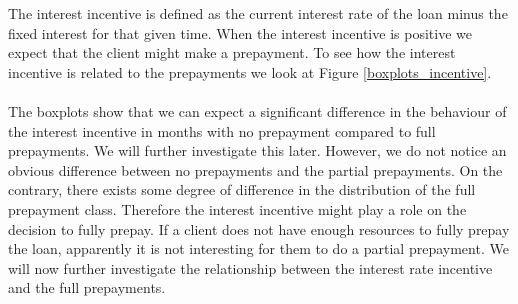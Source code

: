     The interest incentive is defined as the current interest rate 
    of the loan minus the fixed interest for that given time. 
    When the interest incentive is positive we expect that the client 
    might make a prepayment. To see how the interest incentive 
    is related to the prepayments we look at Figure 
    \ref{boxplots_incentive}. 
    \\\\
    The boxplots show that we can expect a significant difference in 
    the behaviour of the interest incentive in months with no 
    prepayment compared to full prepayments. We will further investigate this later. However, we do not notice an obvious difference between no 
    prepayments and the partial prepayments. On the contrary, there exists some degree of difference in the distribution of the full prepayment class. Therefore the interest incentive might play a role on the decision to fully prepay. If a client does not have enough 
    resources to fully prepay the loan, apparently it is not 
    interesting for them to do a partial prepayment. We will 
    now further investigate the relationship between the 
    interest rate incentive and the full prepayments.


